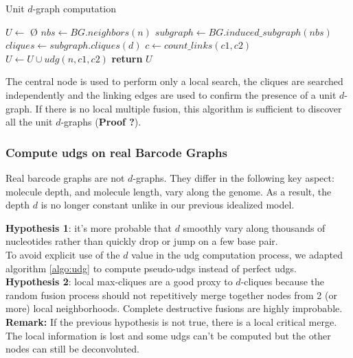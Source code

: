 \begin{algorithm}
    \caption{Unit $d$-graph computation}
    \label{algo:udg}
    \begin{algorithmic}[1] %
         
            \State $U \gets$ \O
            \State $nbs\gets BG.neighbors(n)$
            \State $subgraph \gets BG.induced\_subgraph(nbs)$
            \State $cliques \gets subgraph.cliques(d)$ 
                    \State $c \gets count\_links(c1, c2)$ 
                        \State $U \gets U \cup udg(n, c1, c2)$ 
                    \EndIf
                \EndFor
            \EndFor
            \State \textbf{return} $U$
        \EndProcedure
    \end{algorithmic}
\end{algorithm}


The central node is used to perform only a local search, the cliques are searched independently and the linking edges are used to confirm the presence of a unit $d$-graph.
If there is no local multiple fusion, this algorithm is sufficient to discover all the unit $d$-graphs (\textbf{Proof ?}).

\subsubsection*{Compute udgs on real Barcode Graphs}

Real barcode graphs are not $d$-graphs. They differ in the following key aspect: molecule depth, and molecule length, vary along the genome. As a result, the depth $d$ is no longer constant unlike in our previous idealized model.

\textbf{Hypothesis 1}: it's more probable that $d$ smoothly vary along thousands of nucleotides rather than quickly drop or jump on a few base pair.\\
To avoid explicit use of the $d$ value in the udg computation process, we adapted algorithm \ref{algo:udg} to compute pseudo-udgs instead of perfect udgs.\\
\textbf{Hypothesis 2}: local max-cliques are a good proxy to $d$-cliques because the random fusion process should not repetitively merge together nodes from 2 (or more) local neighborhoods. Complete destructive fusions are highly improbable.\\
\textbf{Remark:} If the previous hypothesis is not true, there is a local critical merge.
The local information is lost and some udgs can't be computed but the other nodes can still be deconvoluted.

